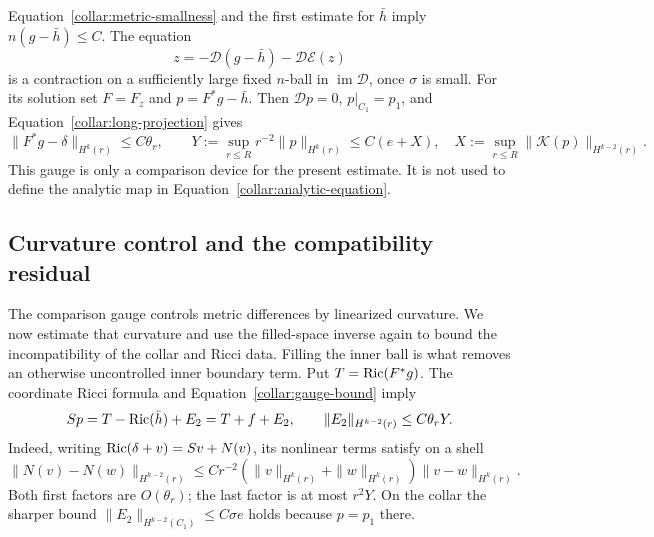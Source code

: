 Equation~\eqref{collar:metric-smallness} and the first estimate for
\(\bar h\) imply \(n(g-\bar h)\le C\).  The equation
\[
 z=-\mathcal D(g-\bar h)-\mathcal D\mathcal E(z)
\]
is a contraction on a sufficiently large fixed \(n\)-ball in
\(\operatorname{im}\mathcal D\), once \(\sigma\) is small.
For its solution set \(F=F_z\) and \(p=F^*g-\bar h\).
Then \(\mathcal Dp=0\), \(p|_{C_1}=p_1\), and
Equation~\eqref{collar:long-projection} gives
\begin{equation}
 \|F^*g-\delta\|_{H^k(r)}\le C\theta_r,
 \qquad
 Y:=\sup_{r\le R}r^{-2}\|p\|_{H^k(r)}\le C(e+X),
 \quad
 X:=\sup_{r\le R}\|\mathcal K(p)\|_{H^{k-2}(r)}.
 \label{collar:gauge-bound}
\end{equation}
This gauge is only a comparison device for the present estimate.
It is not used to define the analytic map in
Equation~\eqref{collar:analytic-equation}.

\subsection{Curvature control and the compatibility residual}
\label{collar:residual-proof}

The comparison gauge controls metric differences by linearized
curvature. We now estimate that curvature and use the filled-space
inverse again to bound the incompatibility of the collar and Ricci
data. Filling the inner ball is what removes an otherwise uncontrolled
inner boundary term.
Put \(T=\operatorname{Ric}(F^*g)\).  The coordinate Ricci formula and
Equation~\eqref{collar:gauge-bound} imply
\begin{equation}
 Sp=T-\operatorname{Ric}(\bar h)+E_2=T+f+E_2,
 \qquad \|E_2\|_{H^{k-2}(r)}\le C\theta_rY.
 \label{collar:quadratic-error}
\end{equation}
Indeed, writing \(\operatorname{Ric}(\delta+v)=Sv+N(v)\), its nonlinear
terms satisfy on a shell
\[
 \|N(v)-N(w)\|_{H^{k-2}(r)}
 \le Cr^{-2}(\|v\|_{H^k(r)}+\|w\|_{H^k(r)})
                     \|v-w\|_{H^k(r)}.
\]
Both first factors are \(O(\theta_r)\); the last factor is at
most \(r^2Y\).  On the collar the sharper bound
\(\|E_2\|_{H^{k-2}(C_1)}\le C\sigma e\) holds because
\(p=p_1\) there.

